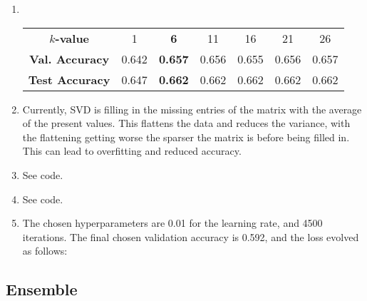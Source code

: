 \documentclass[twocolumn]{article}
\begin{document}
\begin{enumerate}

\item 
~
\vspace{-0.2cm}
\begin{mcfigure}
    \centering
    {\footnotesize
        \setlength{\tabcolsep}{3pt}
        \begin{tabular}{ |c|c|c|c|c|c|c| } 
            \hline
            \textbf{$k$-value} & 1 & {\bf6} &  11 & 16 & 21 & 26 \\ 
            \textbf{Val. Accuracy} & 0.642 & {\bf0.657} &  0.656
                              & 0.655 & 0.656 & 0.657 \\ 
            \textbf{Test Accuracy} & 0.647 & {\bf0.662} &  0.662
                              & 0.662 & 0.662 & 0.662 \\                  
            \hline
        \end{tabular}
    }
    \label{fig:userclustering}
\end{mcfigure}

\item 

Currently, SVD is filling in the missing entries of the matrix with the average of the present values. This flattens the data and reduces the variance, with the flattening getting worse the sparser the matrix is before being filled in. This can lead to overfitting and reduced accuracy.

\item 

See code.

\item 

See code.

\item 

The chosen hyperparameters are 0.01 for the learning rate, and 4500 iterations. The final chosen validation accuracy is 0.592, and the loss evolved as follows: 
\begin{figure}[H]
    \centering
    
    \label{fig:questionclustering}
\end{figure}

\end{enumerate}

\subsection{Ensemble}
\blindtext
\end{document}
